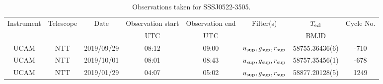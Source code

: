 \begin{table}
	\begin{center}
		\caption{Observations taken for SSSJ0522-3505.}
		\label{table:observing:observation logs SSSJ0522-3505}
		\begin{tabular}{cccccccc}
			\hline
			Instrument & Telescope & Date & Observation start & Observation end & Filter(s) & $T_{\rm ecl}$ & Cycle No. \\
			 &  &  & UTC & UTC &  & BMJD &  \\
			\hline
			\hline
			UCAM & NTT & 2019/09/29 & 08:12    & 09:00    & $u_{\rm sup},g_{\rm sup},r_{\rm sup}$ & 58755.36436(6)                                                                                                           &                                        -710 \\
			UCAM & NTT & 2019/10/01 & 08:01    & 08:43    & $u_{\rm sup},g_{\rm sup},r_{\rm sup}$ & 58757.35456(1)                                                                                                            &                                        -678 \\
			UCAM & NTT & 2019/01/29 & 04:07    & 05:02    & $u_{\rm sup},g_{\rm sup},r_{\rm sup}$ & 58877.20128(5)                                                                                                            &                                        1249 \\
		   \hline
		\end{tabular}
	\end{center}
\end{table}